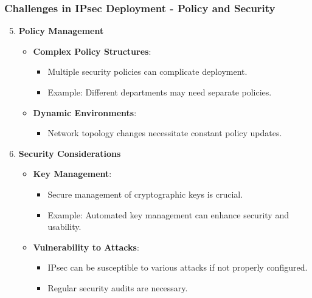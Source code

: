 \documentclass{beamer}
\begin{document}
\begin{frame}[fragile]
    \frametitle{Challenges in IPsec Deployment - Policy and Security}
    \begin{enumerate}
        \setcounter{enumi}{4}
        \item \textbf{Policy Management}
        \begin{itemize}
            \item \textbf{Complex Policy Structures}:
            \begin{itemize}
                \item Multiple security policies can complicate deployment.
                \item Example: Different departments may need separate policies.
            \end{itemize}
            
            \item \textbf{Dynamic Environments}:
            \begin{itemize}
                \item Network topology changes necessitate constant policy updates.
            \end{itemize}
        \end{itemize}

        \item \textbf{Security Considerations}
        \begin{itemize}
            \item \textbf{Key Management}:
            \begin{itemize}
                \item Secure management of cryptographic keys is crucial.
                \item Example: Automated key management can enhance security and usability.
            \end{itemize}

            \item \textbf{Vulnerability to Attacks}:
            \begin{itemize}
                \item IPsec can be susceptible to various attacks if not properly configured.
                \item Regular security audits are necessary.
            \end{itemize}
        \end{itemize}
    \end{enumerate}
\end{frame}
\end{document}
